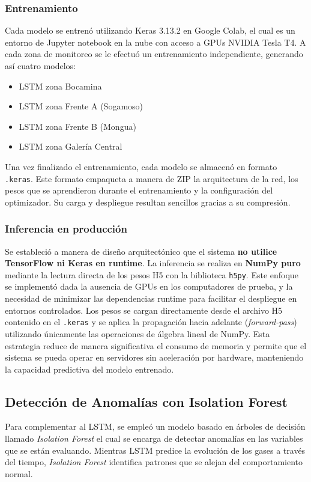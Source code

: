 \documentclass[journal,onecolumn]{IEEEtran}
\begin{document}
\subsubsection{Entrenamiento}
Cada modelo se entrenó utilizando Keras 3.13.2 \cite{keras} en Google Colab, el cual es un entorno de Jupyter notebook en la nube con acceso a GPUs NVIDIA Tesla T4. A cada zona de monitoreo se le efectuó un entrenamiento independiente, generando así cuatro modelos:

\begin{itemize}
    \item LSTM zona Bocamina
    \item LSTM zona Frente A (Sogamoso)
    \item LSTM zona Frente B (Mongua)
    \item LSTM zona Galería Central
\end{itemize}

Una vez finalizado el entrenamiento, cada modelo se almacenó en formato \texttt{.keras}. Este formato empaqueta a manera de ZIP la arquitectura de la red, los pesos que se aprendieron durante el entrenamiento y la configuración del optimizador. Su carga y despliegue resultan sencillos gracias a su compresión.\\

\subsubsection{Inferencia en producción}
Se estableció a manera de diseño arquitectónico que el sistema \textbf{no utilice TensorFlow ni Keras en runtime}. La inferencia se realiza en \textbf{NumPy puro} mediante la lectura directa de los pesos H5 con la biblioteca \texttt{h5py}. Este enfoque se implementó dada la ausencia de GPUs en los computadores de prueba, y la necesidad de minimizar las dependencias runtime para facilitar el despliegue en entornos controlados. Los pesos se cargan directamente desde el archivo H5 contenido en el \texttt{.keras} y se aplica la propagación hacia adelante (\textit{forward-pass}) utilizando únicamente las operaciones de álgebra lineal de NumPy. Esta estrategia reduce de manera significativa el consumo de memoria y permite que el sistema se pueda operar en servidores sin aceleración por hardware, manteniendo la capacidad predictiva del modelo entrenado.

\subsection{Detección de Anomalías con Isolation Forest}
Para complementar al LSTM, se empleó un modelo basado en árboles de decisión llamado \textit{Isolation Forest} \cite{liu2008} el cual se encarga de detectar anomalías en las variables que se están evaluando. Mientras LSTM predice la evolución de los gases a través del tiempo, \textit{Isolation Forest} identifica patrones que se alejan del comportamiento normal. 
\end{document}
